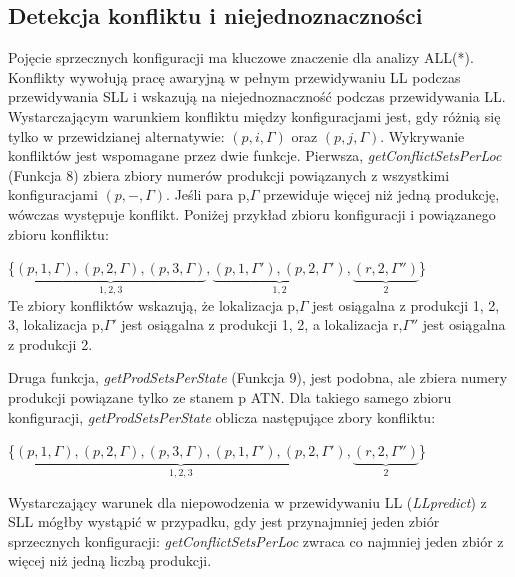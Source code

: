 ﻿\subsection{Detekcja konfliktu i niejednoznaczności}
Pojęcie sprzecznych konfiguracji ma kluczowe znaczenie dla analizy ALL(*).
Konflikty wywołują pracę awaryjną w pełnym przewidywaniu LL podczas przewidywania
SLL i wskazują na niejednoznaczność podczas przewidywania LL.
Wystarczającym warunkiem konfliktu między konfiguracjami jest, gdy różnią się
tylko w przewidzianej alternatywie: $(p, i, \Gamma)$ oraz $(p, j, \Gamma)$.
Wykrywanie konfliktów jest wspomagane przez dwie funkcje.
Pierwsza, \textit{getConflictSetsPerLoc} (Funkcja 8) zbiera zbiory numerów produkcji powiązanych
z wszystkimi konfiguracjami $(p, -, \Gamma)$.
Jeśli para p,$\Gamma$ przewiduje więcej niż jedną produkcję, wówczas występuje konflikt.
Poniżej przykład zbioru konfiguracji i powiązanego zbioru konfliktu:
\par
\{$\underbrace{(p,1,\Gamma),(p,2,\Gamma),(p,3,\Gamma)}_{1,2,3},
\underbrace{(p,1,\Gamma'),(p,2,\Gamma')}_{1,2},\underbrace{(r,2,\Gamma'')}_{2}$\}
\\
Te zbiory konfliktów wskazują, że lokalizacja p,$\Gamma$ jest osiągalna z produkcji {1, 2, 3},
lokalizacja p,$\Gamma'$ jest osiągalna z produkcji {1, 2},
a lokalizacja r,$\Gamma''$ jest osiągalna z produkcji {2}.
\\
\par
Druga funkcja, \textit{getProdSetsPerState} (Funkcja 9), jest podobna, ale zbiera numery
produkcji powiązane tylko ze stanem p ATN.
Dla takiego samego zbioru konfiguracji, \textit{getProdSetsPerState} oblicza następujące zbory konfliktu:
\par
\{$\underbrace{(p,1,\Gamma),(p,2,\Gamma),(p,3,\Gamma),(p,1,\Gamma'),(p,2,\Gamma')}_{1,2,3},
\underbrace{(r,2,\Gamma'')}_{2}$\}
\par
Wystarczający warunek dla niepowodzenia w przewidywaniu LL (\textit{LLpredict})
z SLL mógłby wystąpić w przypadku, gdy jest przynajmniej jeden zbiór sprzecznych konfiguracji:
\textit{getConflictSetsPerLoc} zwraca co najmniej jeden zbiór z więcej niż jedną liczbą produkcji.

